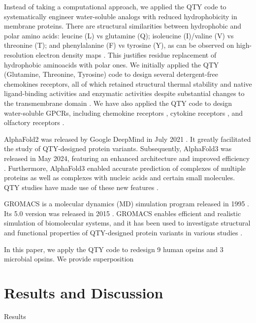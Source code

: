 \documentclass[fleqn,10pt,lineno]{manuscript}
\begin{document}
Instead of taking a computational approach, we applied the QTY code to systematically engineer water-soluble analogs with reduced hydrophobicity in membrane proteins. There are structural similarities between hydrophobic and polar amino acids: leucine (L) vs glutamine (Q); isoleucine (I)/valine (V) vs threonine (T); and phenylalanine (F) vs tyrosine (Y), as can be observed on high-resolution electron density maps \citep{Zhang_2018, Zhang_2022, Tegler_2020}. This justifies residue replacement of hydrophobic aminoacids with polar ones. We initially applied the QTY (Glutamine, Threonine, Tyrosine) code to design several detergent-free chemokines receptors, all of which retained structural thermal stability and native ligand-binding activities and enzymatic activities despite substantial changes to the transmembrane domain \citep{Zhang_2018, Tegler_2020}. We have also applied the QTY code to design water-soluble GPCRs, including chemokine receptors \citep{Zhang_2018, Qing_2019, Tegler_2020, Skuhersky_2021}, cytokine receptors \citep{Hao_2020}, and olfactory receptors \citep{Skuhersky_2021, Johnsson_2025}. 

AlphaFold2 was released by Google DeepMind in July 2021 \citep{Jumper_2021}. It greatly facilitated the study of QTY-designed protein variants. Subsequently, AlphaFold3 was released in May 2024, featuring an enhanced architecture and improved efficiency \citep{Abramson_2024}. Furthermore, AlphaFold3 enabled accurate prediction of complexes of multiple proteins as well as complexes with nucleic acids and certain small molecules. QTY studies have made use of these new features \citep{Chen_2025, Johnsson_2025}. 

GROMACS is a molecular dynamics (MD) simulation program released in 1995 \citep{Berendsen_1995}. Its 5.0 version was released in 2015 \citep{Abraham_2015}. GROMACS enables efficient and realistic simulation of biomolecular systems, and it has been used to investigate structural and functional properties of QTY-designed protein variants in various studies \citep{Karagol_2024, Li_Tang_2024, Smorodina_2024, Li_Wang_2024, Johnsson_2025}. 

In this paper, we apply the QTY code to redesign 9 human opsins and 3 microbial opsins. We provide superposition

\section*{Results and Discussion}

Results
\end{document}
